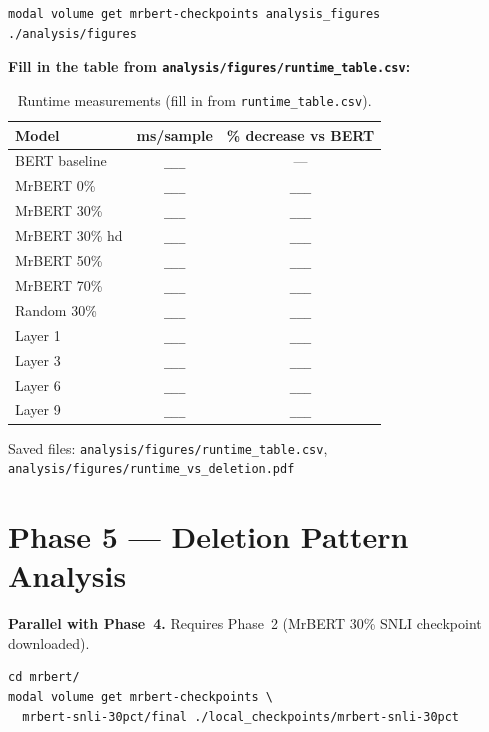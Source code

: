 \documentclass[11pt,a4paper]{article}
\newcommand{\tbd}{\textcolor{placeholder}{\texttt{\_\_\_}}}
\begin{document}
\begin{lstlisting}
modal volume get mrbert-checkpoints analysis_figures ./analysis/figures
\end{lstlisting}

\textbf{Fill in the table from \texttt{analysis/figures/runtime\_table.csv}:}

\begin{table}[h]
\centering
\begin{tabular}{@{}lcc@{}}
\toprule
\textbf{Model} & \textbf{ms/sample} & \textbf{\% decrease vs BERT} \\
\midrule
BERT baseline    & \tbd & ---  \\
MrBERT 0\%       & \tbd & \tbd \\
MrBERT 30\%      & \tbd & \tbd \\
MrBERT 30\% hd   & \tbd & \tbd \\
MrBERT 50\%      & \tbd & \tbd \\
MrBERT 70\%      & \tbd & \tbd \\
Random 30\%      & \tbd & \tbd \\
Layer 1          & \tbd & \tbd \\
Layer 3          & \tbd & \tbd \\
Layer 6          & \tbd & \tbd \\
Layer 9          & \tbd & \tbd \\
\bottomrule
\end{tabular}
\caption{Runtime measurements (fill in from \texttt{runtime\_table.csv}).}
\label{tab:runtime}
\end{table}

Saved files: \texttt{analysis/figures/runtime\_table.csv}, \texttt{analysis/figures/runtime\_vs\_deletion.pdf}


\section{Phase 5 --- Deletion Pattern Analysis}
\label{sec:phase5}

\begin{mdframed}[style=notestyle]
\textbf{Parallel with Phase~4.} Requires Phase~2 (MrBERT 30\% SNLI checkpoint downloaded).
\end{mdframed}

\begin{lstlisting}
cd mrbert/
modal volume get mrbert-checkpoints \
  mrbert-snli-30pct/final ./local_checkpoints/mrbert-snli-30pct
\end{lstlisting}
\end{document}
